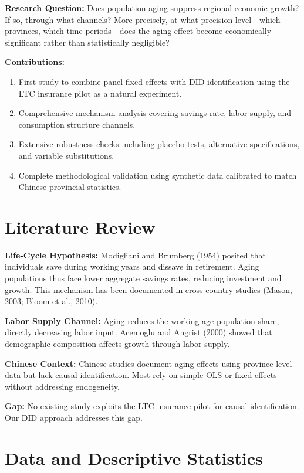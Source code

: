 \documentclass[12pt]{article}
\begin{document}
\textbf{Research Question:} Does population aging suppress regional economic growth? If so, through what channels? More precisely, at what precision level---which provinces, which time periods---does the aging effect become economically significant rather than statistically negligible?

\textbf{Contributions:}
\begin{enumerate}
    \item First study to combine panel fixed effects with DID identification using the LTC insurance pilot as a natural experiment.
    \item Comprehensive mechanism analysis covering savings rate, labor supply, and consumption structure channels.
    \item Extensive robustness checks including placebo tests, alternative specifications, and variable substitutions.
    \item Complete methodological validation using synthetic data calibrated to match Chinese provincial statistics.
\end{enumerate}

\section{Literature Review}

\textbf{Life-Cycle Hypothesis:} Modigliani and Brumberg (1954) posited that individuals save during working years and dissave in retirement. Aging populations thus face lower aggregate savings rates, reducing investment and growth. This mechanism has been documented in cross-country studies (Mason, 2003; Bloom et al., 2010).

\textbf{Labor Supply Channel:} Aging reduces the working-age population share, directly decreasing labor input. Acemoglu and Angrist (2000) showed that demographic composition affects growth through labor supply.

\textbf{Chinese Context:} Chinese studies document aging effects using province-level data but lack causal identification. Most rely on simple OLS or fixed effects without addressing endogeneity.

\textbf{Gap:} No existing study exploits the LTC insurance pilot for causal identification. Our DID approach addresses this gap.

\section{Data and Descriptive Statistics}
\end{document}
